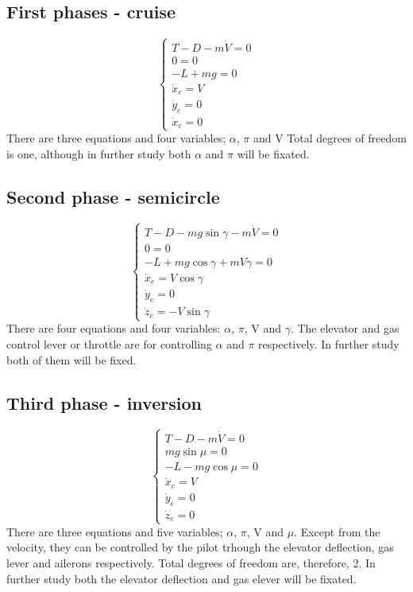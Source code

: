 \subsection*{First phases - cruise}
\begin{equation}
	\begin{cases}
		T - D -m\dot{V}=0\\
		0=0\\
		-L+mg=0\\
		\dot{x}_e=V\\
		\dot{y}_e=0\\
		\dot{x}_e=0
	\end{cases}
\end{equation}
There are three equations and four variables; $\alpha$, $\pi$ and V
Total degrees of freedom is one, although in further study both $\alpha$ and $\pi$ will be fixated.

\subsection*{Second phase - semicircle}
\begin{equation}
	\begin{cases}
		T - D -mg\sin\gamma-m\dot{V}=0\\
		0=0\\
		-L+mg\cos\gamma+mV\dot{\gamma}=0\\
		\dot{x}_e=V\cos\gamma\\
		\dot{y}_e=0\\
		\dot{z}_e=-V\sin\gamma
	\end{cases}
\label{eq:semicircle}
\end{equation}
There are four equations and four variables: $\alpha$, $\pi$, V and $\gamma$. The elevator and gas control lever or throttle are for controlling $\alpha$ and $\pi$ respectively. In further study both of them will be fixed.


\subsection*{Third phase - inversion}
\begin{equation}
	\begin{cases}
		T - D -m\dot{V}=0\\
		mg\sin\mu=0\\
		-L-mg\cos\mu=0\\
		\dot{x}_e=V\\
		\dot{y}_e=0\\
		\dot{z}_e=0
	\end{cases}
\end{equation}
There are three equations and five variables; $\alpha$, $\pi$, V and $\mu$. Except from the velocity, they can be controlled by the pilot trhough the elevator deflection, gas lever and ailerons respectively.
Total degrees of freedom are, therefore, 2. In further study both the elevator deflection and gas elever will be fixated.

